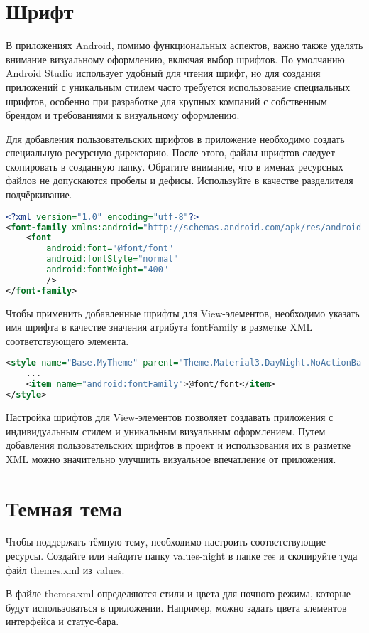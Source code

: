 \section{Шрифт}

В приложениях Android, помимо функциональных аспектов,
важно также уделять внимание визуальному оформлению, включая выбор шрифтов.
По умолчанию Android Studio использует удобный для чтения шрифт,
но для создания приложений с уникальным стилем часто требуется использование
специальных шрифтов, особенно при разработке для крупных компаний
с собственным брендом и требованиями к визуальному оформлению.\par
Для добавления пользовательских шрифтов в приложение необходимо создать
специальную ресурсную директорию. После этого, файлы шрифтов следует
скопировать в созданную папку. Обратите внимание,
что в именах ресурсных файлов не допускаются пробелы и дефисы.
Используйте в качестве разделителя подчёркивание.

\begin{lstlisting}[language=XML]
<?xml version="1.0" encoding="utf-8"?>
<font-family xmlns:android="http://schemas.android.com/apk/res/android">
    <font
        android:font="@font/font"
        android:fontStyle="normal"
        android:fontWeight="400"
        />
</font-family>
\end{lstlisting}

Чтобы применить добавленные шрифты для View-элементов,
необходимо указать имя шрифта в качестве значения атрибута fontFamily
в разметке XML соответствующего элемента.

\begin{lstlisting}[language=XML]
<style name="Base.MyTheme" parent="Theme.Material3.DayNight.NoActionBar">
	...
	<item name="android:fontFamily">@font/font</item>
</style>
\end{lstlisting}

Настройка шрифтов для View-элементов позволяет создавать приложения
с индивидуальным стилем и уникальным визуальным оформлением.
Путем добавления пользовательских шрифтов в проект и использования
их в разметке XML можно значительно улучшить визуальное впечатление
от приложения.

\section{Темная тема}

Чтобы поддержать тёмную тему, необходимо настроить соответствующие ресурсы.
Создайте или найдите папку values-night в папке res
и скопируйте туда файл themes.xml из values.\par
В файле themes.xml определяются стили и цвета для ночного режима,
которые будут использоваться в приложении.
Например, можно задать цвета элементов интерфейса и статус-бара.


